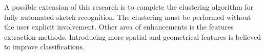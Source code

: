 \documentclass[a4paper,10pt]{IEEEconf}
\begin{document}
A possible extension of this research is to complete the clustering algorithm for fully automated sketch recognition. The clustering must be performed without the user explicit involvement. Other area of enhancements is the features extraction methods. Introducing more spatial and geometrical features is believed to improve classifications.  %
%

\end{document}
